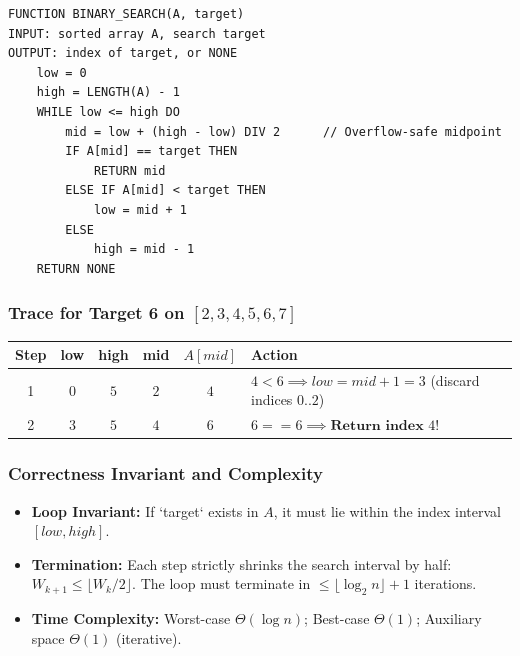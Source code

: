 \documentclass[11pt,a4paper]{article}
\begin{document}
\begin{lstlisting}[style=pseudostyle]
FUNCTION BINARY_SEARCH(A, target)
INPUT: sorted array A, search target
OUTPUT: index of target, or NONE
    low = 0
    high = LENGTH(A) - 1
    WHILE low <= high DO
        mid = low + (high - low) DIV 2      // Overflow-safe midpoint
        IF A[mid] == target THEN
            RETURN mid
        ELSE IF A[mid] < target THEN
            low = mid + 1
        ELSE
            high = mid - 1
    RETURN NONE
\end{lstlisting}

\subsubsection{Trace for Target 6 on \texorpdfstring{$[2, 3, 4, 5, 6, 7]$}{[2, 3, 4, 5, 6, 7]}}
\begin{center}
\begin{tabular}{c c c c c l}
\toprule
\textbf{Step} & \textbf{low} & \textbf{high} & \textbf{mid} & \textbf{$A[mid]$} & \textbf{Action} \\
\midrule
1 & $0$ & $5$ & $2$ & $4$ & $4 < 6 \implies low = mid + 1 = 3$ (discard indices $0..2$) \\
2 & $3$ & $5$ & $4$ & $6$ & $6 == 6 \implies \textbf{Return index } 4$! \\
\bottomrule
\end{tabular}
\end{center}

\subsubsection{Correctness Invariant and Complexity}
\begin{itemize}[itemsep=2pt]
    \item \textbf{Loop Invariant:} If `target` exists in $A$, it must lie within the index interval $[low, high]$.
    \item \textbf{Termination:} Each step strictly shrinks the search interval by half: $W_{k+1} \le \lfloor W_k / 2 \rfloor$. The loop must terminate in $\le \lfloor \log_2 n \rfloor + 1$ iterations.
    \item \textbf{Time Complexity:} Worst-case $\Theta(\log n)$; Best-case $\Theta(1)$; Auxiliary space $\Theta(1)$ (iterative).
\end{itemize}
\end{document}
